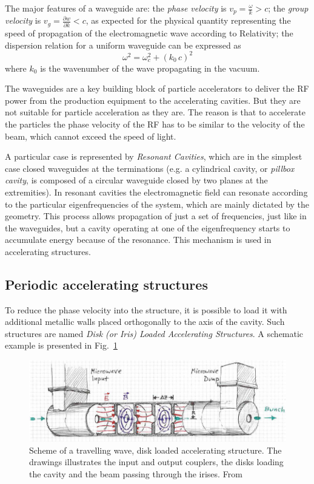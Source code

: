 The major features of a waveguide are: the \textit{phase velocity} is $v_p=\frac{\omega}{k} > c$; the \textit{group velocity} is $v_g = \frac{\partial w}{\partial k} < c$, as expected for the physical quantity representing the speed of propagation of the electromagnetic wave according to Relativity; the dispersion relation for a uniform waveguide can be expressed as 
\begin{equation}
\omega^2 = \omega^2_c + (k_0 \, c)^2
\end{equation}
where $k_0$ is the wavenumber of the wave propagating in the vacuum.

The waveguides are a key building block of particle accelerators to deliver the RF power from the production equipment to the accelerating cavities. But they are not suitable for particle acceleration as they are. The reason is that to accelerate the particles the phase velocity of the RF has to be similar to the velocity of the beam, which cannot exceed the speed of light.

A particular case is represented by \textit{Resonant Cavities}, which are in the simplest case closed waveguides at the terminations (e.g. a cylindrical cavity, or \textit{pillbox cavity}, is composed of a circular waveguide closed by two planes at the extremities). In resonant cavities the electromagnetic field can resonate according to the particular eigenfrequencies of the system, which are mainly dictated by the geometry. This process allows propagation of just a set of frequencies, just like in the waveguides, but a cavity operating at one of the eigenfrequency starts to accumulate energy because of the resonance. This mechanism is used in accelerating structures.


\subsection[Periodic accelerating structures]{Periodic accelerating structures}

To reduce the phase velocity into the structure, it is possible to load it with additional metallic walls placed orthogonally to the axis of the cavity.  Such structures are named \textit{Disk (or Iris) Loaded Accelerating Structures}. A schematic example is presented in Fig.~\ref{ACS_scheme}

\begin{figure}[h]
\centering

\includegraphics[scale=0.45]{pictures/scheme_ACS}
\caption{Scheme of a travelling wave, disk loaded accelerating structure. The drawings illustrates the input and output couplers, the disks loading the cavity and the beam passing through the irises. From \cite{streun}}
\label{ACS_scheme}

\end{figure}

